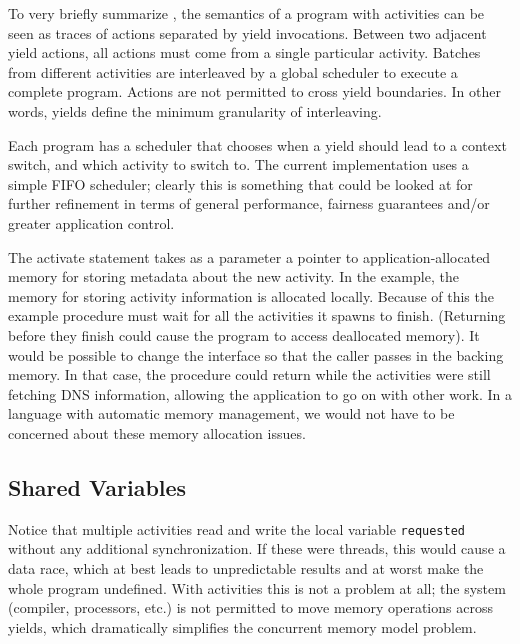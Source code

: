 \documentclass[9pt,preprint]{sigplanconf}
\begin{document}
To very briefly summarize \cite{Abadi2009}, the semantics of a program with activities can be seen as traces of actions separated by yield invocations.
Between two adjacent yield actions, all actions must come from a single particular activity.
Batches from different activities are interleaved by a global scheduler to execute a complete program.
Actions are not permitted to cross yield boundaries.
In other words, yields define the minimum granularity of interleaving.

Each \charcoal{} program has a scheduler that chooses when a yield should lead to a context switch, and which activity to switch to.
The current \charcoal{} implementation uses a simple FIFO scheduler; clearly this is something that could be looked at for further refinement in terms of general performance, fairness guarantees and/or greater application control.

The activate statement takes as a parameter a pointer to application-allocated memory for storing metadata about the new activity.
In the example, the memory for storing activity information is allocated locally.
Because of this the example procedure must wait for all the activities it spawns to finish.
(Returning before they finish could cause the program to access deallocated memory).
It would be possible to change the interface so that the caller passes in the backing memory.
In that case, the procedure could return while the activities were still fetching DNS information, allowing the application to go on with other work.
In a language with automatic memory management, we would not have to be concerned about these memory allocation issues.


\subsection{Shared Variables}

Notice that multiple activities read and write the local variable \texttt{requested} without any additional synchronization.
If these were threads, this would cause a data race, which at best leads to unpredictable results and at worst make the whole program undefined.
With activities this is not a problem at all; the system (compiler, processors, etc.) is not permitted to move memory operations across yields, which dramatically simplifies the concurrent memory model problem.
\end{document}
